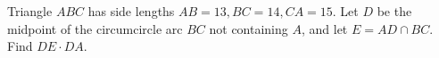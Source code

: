 Triangle $ABC$ has side lengths $AB=13,BC=14,CA=15$. Let $D$ be the midpoint of the circumcircle arc $BC$ not containing $A$, and let $E=AD\cap BC$. Find $DE\cdot DA$.
